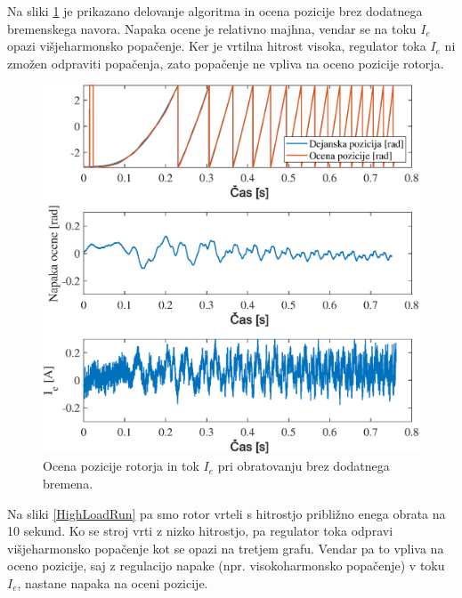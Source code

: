 \documentclass[a4paper,twoside,openright,12pt,slovene]{book}
\begin{document}
Na sliki \ref{NoLoadRun} je prikazano delovanje algoritma in ocena pozicije brez dodatnega bremenskega navora. Napaka ocene je relativno majhna, vendar se na toku $I_e$ opazi
višjeharmonsko popačenje. Ker je vrtilna hitrost visoka, regulator toka $I_e$ ni zmožen odpraviti popačenja, zato popačenje ne vpliva na oceno pozicije rotorja.

\begin{figure}[!htbp]
    \centering
    \includegraphics[width=0.9\columnwidth]{Slike/NoLoadRun.eps}
    \caption{\label{NoLoadRun} Ocena pozicije rotorja in tok $I_e$ pri obratovanju brez dodatnega bremena. }
\end{figure}

\newpage

Na sliki \ref{HighLoadRun} pa smo rotor vrteli s hitrostjo približno enega obrata na 10 sekund. Ko se stroj vrti z nizko hitrostjo, pa regulator toka odpravi višjeharmonsko popačenje kot se opazi na
tretjem grafu. Vendar pa to vpliva na oceno pozicije, saj z regulacijo napake (npr. visokoharmonsko popačenje) v toku $I_e$, nastane napaka na oceni pozicije.
\end{document}
